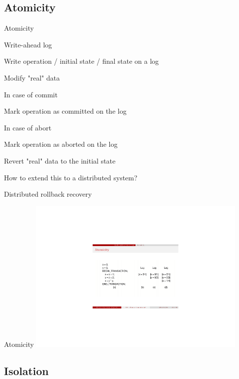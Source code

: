\subsection{Atomicity}


\begin{frame}{Atomicity}
\BI
\item \alert{Write-ahead log}
  \BI
  \item Write operation / initial state / final state on a log
  \item Modify "real" data
  \EI
\item In case of commit
  \BI
  \item Mark operation as committed on the log
  \EI
\item In case of abort
  \BI
  \item Mark operation as aborted on the log
  \item Revert "real" data to the initial state
  \EI
\item How to extend this to a distributed system?
  \BI
  \item \alert{Distributed rollback recovery}
  \EI
\EI
\end{frame}

\begin{frame}{Atomicity}
\includegraphics[width=0.8\textwidth]{fig3-log.pdf}
\end{frame}

\subsection{Isolation}

